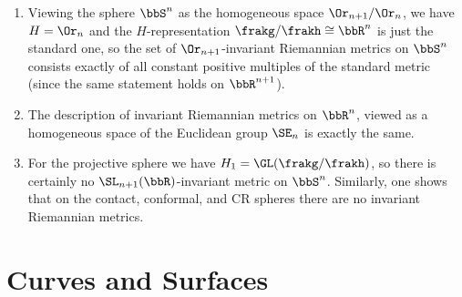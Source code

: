 \begin{example}
    \begin{enumerate}
        \item Viewing the sphere $\bbS^n$ as the homogeneous space $\Or_{n+1}\slash \Or_n$, we have $H=\Or_n$ and the $H$-representation $\frakg\slash\frakh\cong\bbR^n$ is just the standard one, so the set of $\Or_{n+1}$-invariant Riemannian metrics on $\bbS^n$ consists exactly of all constant positive multiples of the standard metric (since the same statement holds on $\bbR^{n+1}$).
        \item The description of invariant Riemannian metrics on $\bbR^n$, viewed as a homogeneous space of the Euclidean group $\SE_n$ is exactly the same. 
        \item For the projective sphere we have $H_1=\GL(\frakg\slash\frakh)$, so there is certainly no $\SL_{n+1}(\bbR)$-invariant metric on $\bbS^n$. Similarly, one shows that on the contact, conformal, and CR spheres there are no invariant Riemannian metrics.
    \end{enumerate}
\end{example}













\section{Curves and Surfaces}


